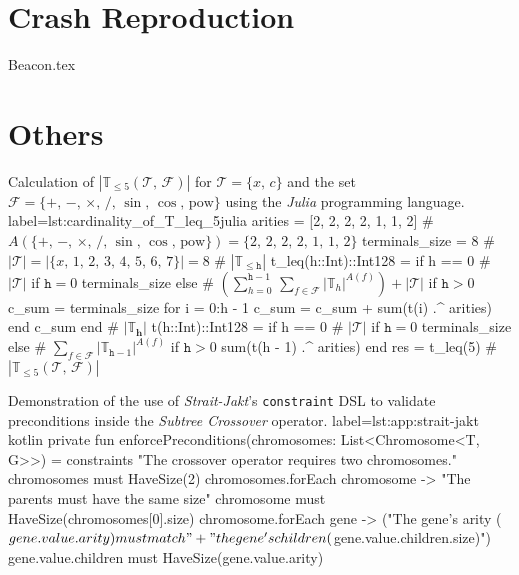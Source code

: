     \section{Crash Reproduction}
        {Beacon.tex}

    \section{Others}
        \begin{code}{
            Calculation of \(|\mathbb{T}_{\leq 5}(\mathcal{T},\, \mathcal{F})|\) for 
            \(\mathcal{T} = \{x,\, c\}\) and the set \(\mathcal{F} = \{+,\, -,\, 
            \times,\, /,\, \sin,\, \cos,\, \mathrm{pow}\}\) using the \textit{Julia}
            programming language.
        }{label={lst:cardinality_of_T_leq_5}}{julia}
            arities = [2, 2, 2, 2, 1, 1, 2] # $A\left(\{+,\,-,\,\times,\,/,\,\sin,\,\cos,\,\mathrm{pow}\}\right) = \{2,\,2,\,2,\,2,\,1,\,1,\,2\}$
            terminals_size = 8  # $|\mathcal{T}| = |\{x,\,1,\,2,\,3,\,4,\,5,\,6,\,7\}| = 8$
            # $|\mathbb{T}_{\leq \mathtt{h}}|$
            t_leq(h::Int)::Int128 = if h == 0 # $|\mathcal{T}|$ if $\mathtt{h} = 0$
            terminals_size
            else  # $\left(\sum_{h = 0}^{\mathtt{h} - 1}\,\sum_{f \in \mathcal{F}} |\mathbb{T}_h|^{A(f)}\right)+ |\mathcal{T}|$ if $\mathtt{h} > 0$
            c_sum = terminals_size
            for i = 0:h - 1
                c_sum = c_sum + sum(t(i) .^ arities)
            end
            c_sum
            end
            # $|\mathbb{T}_\mathbf{h}|$
            t(h::Int)::Int128 = if h == 0 # $|\mathcal{T}|$ if $\mathtt{h} = 0$
            terminals_size
            else  # $\sum_{f \in \mathcal{F}} |\mathbb{T}_{\mathtt{h} - 1}|^{A(f)}$ if $\mathtt{h} > 0$
            sum(t(h - 1) .^ arities) 
            end
            res = t_leq(5)  # $|\mathbb{T}_{\leq 5}(\mathcal{T},\, \mathcal{F})|$
        \end{code}

        
        \begin{code}{
            Demonstration of the use of \textit{Strait-Jakt}'s \texttt{constraint} DSL to validate preconditions inside the 
            \textit{Subtree Crossover} operator.
        }{
            label=lst:app:strait-jakt
        }{kotlin}
            private fun enforcePreconditions(chromosomes: List<Chromosome<T, G>>) = constraints {
                "The crossover operator requires two chromosomes." { chromosomes must HaveSize(2) }
                chromosomes.forEach { chromosome ->
                    "The parents must have the same size" { 
                        chromosome must HaveSize(chromosomes[0].size) 
                    }
                    chromosome.forEach { gene ->
                        ("The gene's arity (${gene.value.arity}) must match "
                            + "the gene's children (${gene.value.children.size})") {
                            gene.value.children must HaveSize(gene.value.arity)
                        }
                    }
                }
            }
        \end{code}

